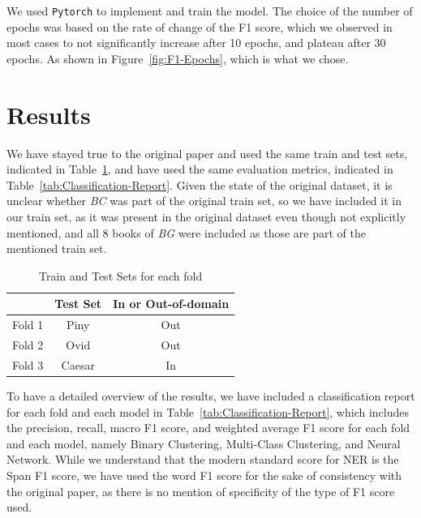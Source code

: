 \documentclass[11pt]{article}
\begin{document}
We used \texttt{Pytorch} to implement and train the model. The choice of the number of epochs was based on the rate of change of the F1 score,
which we observed in most cases to not significantly increase after 10 epochs, and plateau after 30 epochs. As shown in Figure~\ref{fig:F1-Epochs},
which is what we chose.

\section{Results}
We have stayed true to the original paper and used the same train and test sets, indicated in Table~\ref{tab:Train-Test-Sets}, 
and have used the same evaluation metrics, indicated in Table~\ref{tab:Classification-Report}. Given the state of the original dataset, 
it is unclear whether \textit{BC} was part of the original train set, so we have included it in our train set, as it was present in the original
dataset even though not explicitly mentioned, and all 8 books of \textit{BG} were included as those are part of the mentioned train set.

\begin{table}[H]
  \centering
  \begin{tabular}{|l|c|c|}
  \hline
  \textbf{} & \textbf{Test Set} & \textbf{In or Out-of-domain} \\
  \hline
  Fold 1   & Piny & Out \\
  \hline
  Fold 2   & Ovid & Out \\
  \hline
  Fold 3   & Caesar & In \\
  \hline
  \end{tabular}
  \caption{Train and Test Sets for each fold}
  \label{tab:Train-Test-Sets}
\end{table}

To have a detailed overview of the results, we have included a classification report for each fold and each model 
in Table~\ref{tab:Classification-Report}, which includes the precision, recall, macro F1 score, and weighted average F1 score for each fold and each model,
namely Binary Clustering, Multi-Class Clustering, and Neural Network. While we understand that the modern standard score for NER is the
Span F1 score, we have used the word F1 score for the sake of consistency with the original paper, as there is no mention of specificity of the type
of F1 score used.
\end{document}
